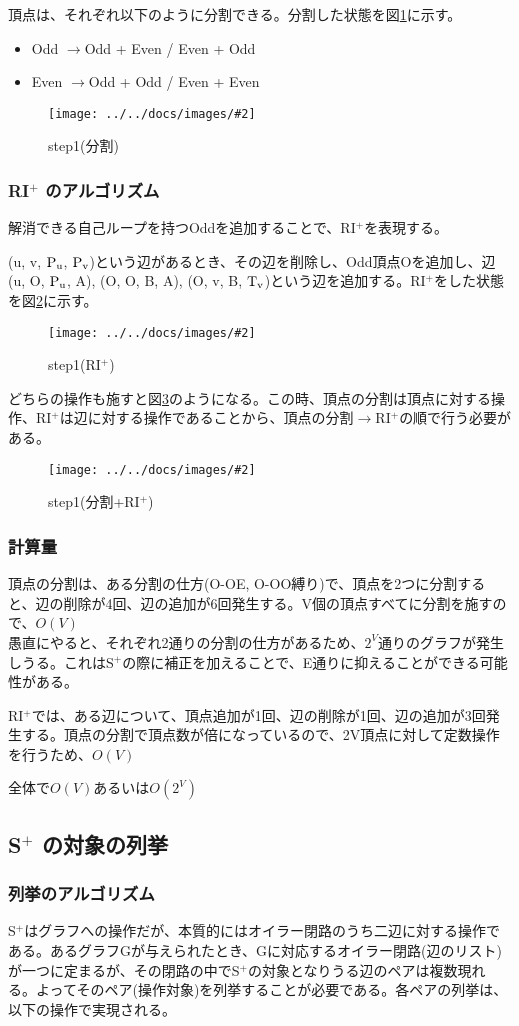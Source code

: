 \documentclass[11pt,a4j]{jarticle}
\newcommand{\splus}{S${}^\text{+}$}
\newcommand{\riplus}{RI${}^\text{+}$}
\newcommand{\f}[1]{$\rm{#1}$} %
\newcommand{\image}[4][height=100pt]{%
\begin{figure}[htbp]
    \centering
    \texttt{[image: ../../docs/images/\#2]}
    \caption{#3}
    \label{fig:#4}
\end{figure}%
}
\newcommand{\ra }{$\rightarrow$}
\newcommand{\tops}[2]{\texorpdfstring{#1}{#2}} %
\begin{document}
頂点は、それぞれ以下のように分割できる。分割した状態を図\ref{fig:split}に示す。
\begin{itemize}
    \item Odd \ra  Odd + Even / Even + Odd
    \item Even \ra  Odd + Odd / Even + Even
\end{itemize}

\image{extend_split.jpg}{step1(分割)}{split}

\subsubsection{\tops{\riplus}{RI+} のアルゴリズム}
解消できる自己ループを持つOddを追加することで、\riplus を表現する。

(u, v, \f{P_u}, \f{P_v})という辺があるとき、その辺を削除し、Odd頂点Oを追加し、辺(u, O, \f{P_u}, A), (O, O, B, A), (O, v, B, \f{T_v})という辺を追加する。\riplus をした状態を図\ref{fig:riplus}に示す。

\image{extend_riplus.jpg}{step1(\riplus )}{riplus}

どちらの操作も施すと図\ref{fig:total}のようになる。この時、頂点の分割は頂点に対する操作、\riplus は辺に対する操作であることから、頂点の分割\ra \riplus の順で行う必要がある。
\image{extend_total.jpg}{step1(分割+\riplus )}{total}

\subsubsection{計算量}
頂点の分割は、ある分割の仕方(O-OE, O-OO縛り)で、頂点を2つに分割すると、辺の削除が4回、辺の追加が6回発生する。V個の頂点すべてに分割を施すので、$O(V)$\\
愚直にやると、それぞれ2通りの分割の仕方があるため、$2^V$通りのグラフが発生しうる。これは\splus の際に補正を加えることで、E通りに抑えることができる可能性がある。

\riplus では、ある辺について、頂点追加が1回、辺の削除が1回、辺の追加が3回発生する。頂点の分割で頂点数が倍になっているので、2V頂点に対して定数操作を行うため、$O(V)$

全体で$O(V)$あるいは$O(2^V)$

\subsection{\tops{\splus}{S+} の対象の列挙}
\label{enum}
\subsubsection{列挙のアルゴリズム}
\splus はグラフへの操作だが、本質的にはオイラー閉路のうち二辺に対する操作である。あるグラフGが与えられたとき、Gに対応するオイラー閉路(辺のリスト)が一つに定まるが、その閉路の中で\splus の対象となりうる辺のペアは複数現れる。よってそのペア(操作対象)を列挙することが必要である。各ペアの列挙は、以下の操作で実現される。
\end{document}
